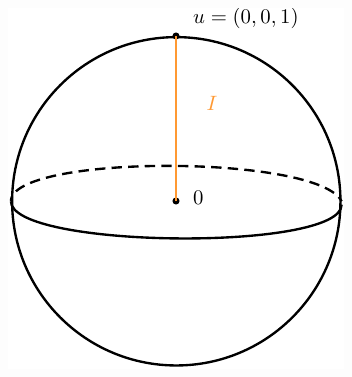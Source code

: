 \documentclass[../mainfile.tex]{subfiles}
\begin{document}
\begin{figure}[hbtp]
\centering
\includegraphics[scale=.86]{3dnonregular.pdf}
\end{figure}
\newpage
\end{document}
